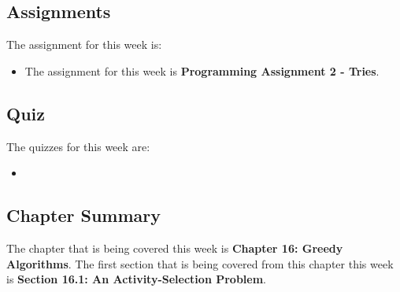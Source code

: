 \subsection{Assignments}

The assignment for this week is:

\begin{itemize}
    \item The assignment for this week is \textbf{Programming Assignment 2 - Tries}. 
\end{itemize}

\subsection{Quiz}

The quizzes for this week are:

\begin{itemize}
    \item {} \textbullet {} 
\end{itemize}

\subsection{Chapter Summary}

The chapter that is being covered this week is \textbf{Chapter 16: Greedy Algorithms}. The first section that is being covered from this chapter this week is \textbf{Section 16.1: An Activity-Selection Problem}.

